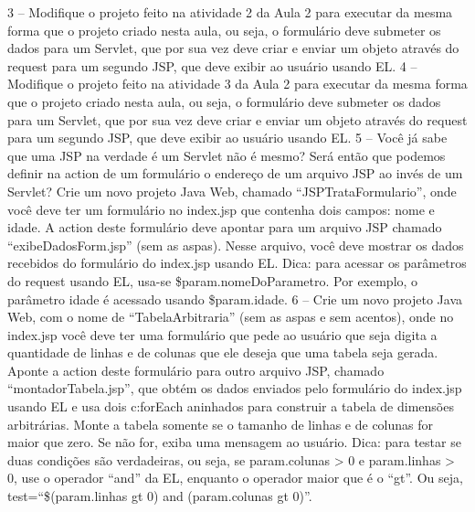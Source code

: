 3 – Modifique o projeto feito na atividade 2 da Aula 2 para executar da mesma forma que o projeto criado nesta aula, ou seja, o formulário deve submeter os dados para um Servlet, que por sua vez deve criar e enviar um objeto através do request para um segundo JSP, que deve exibir ao usuário usando EL.
4 – Modifique o projeto feito na atividade 3 da Aula 2 para executar da mesma forma que o projeto criado nesta aula, ou seja, o formulário deve submeter os dados para um Servlet, que por sua vez deve criar e enviar um objeto através do request para um segundo JSP, que deve exibir ao usuário usando EL.
5 – Você já sabe que uma JSP na verdade é um Servlet não é mesmo? Será então que podemos definir na action de um formulário o endereço de um arquivo JSP ao invés de um Servlet? Crie um novo projeto Java Web, chamado ``JSPTrataFormulario'', onde você deve ter um formulário no index.jsp que contenha dois campos: nome e idade. A action deste formulário deve apontar para um arquivo JSP chamado ``exibeDadosForm.jsp'' (sem as aspas). Nesse arquivo, você deve mostrar os dados recebidos do formulário do index.jsp usando EL. Dica: para acessar os parâmetros do request usando EL, usa-se \${param.nomeDoParametro}. Por exemplo, o parâmetro idade é acessado usando \${param.idade}.
6 – Crie um novo projeto Java Web, com o nome de ``TabelaArbitraria'' (sem as aspas e sem acentos), onde no index.jsp você deve ter uma formulário que pede ao usuário que seja digita a quantidade de linhas e de colunas que ele deseja que uma tabela seja gerada. Aponte a action deste formulário para outro arquivo JSP, chamado ``montadorTabela.jsp'', que obtém os dados enviados pelo formulário do index.jsp usando EL e usa dois c:forEach aninhados para construir a tabela de dimensões arbitrárias. Monte a tabela somente se o tamanho de linhas e de colunas for maior que zero. Se não for, exiba uma mensagem ao usuário. Dica: para testar se duas condições são verdadeiras, ou seja, se param.colunas > 0 e param.linhas > 0, use o operador ``and'' da EL, enquanto o operador maior que é o ``gt''. Ou seja, test=``\${(param.linhas gt 0) and (param.colunas gt 0)}''.
